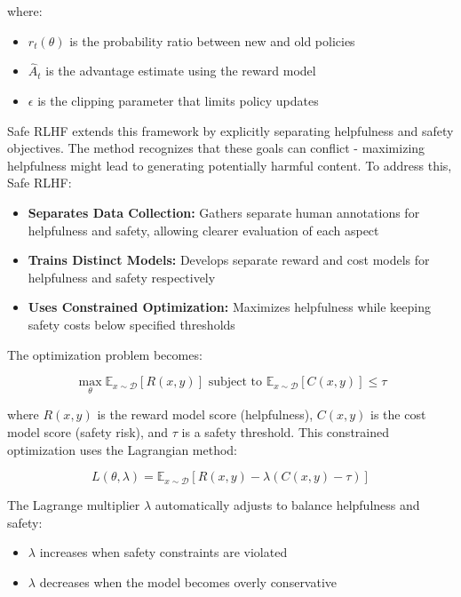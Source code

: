 where:
\begin{itemize}
    \item $r_t(\theta)$ is the probability ratio between new and old policies
    \item $\hat{A}_t$ is the advantage estimate using the reward model
    \item $\epsilon$ is the clipping parameter that limits policy updates
\end{itemize}

Safe RLHF extends this framework by explicitly separating helpfulness and safety objectives. The method recognizes that these goals can conflict - maximizing helpfulness might lead to generating potentially harmful content. To address this, Safe RLHF:

\begin{itemize}
    \item \textbf{Separates Data Collection:} Gathers separate human annotations for helpfulness and safety, allowing clearer evaluation of each aspect
    
    \item \textbf{Trains Distinct Models:} Develops separate reward and cost models for helpfulness and safety respectively
    
    \item \textbf{Uses Constrained Optimization:} Maximizes helpfulness while keeping safety costs below specified thresholds
\end{itemize}

The optimization problem becomes:

\begin{equation}
    \max_\theta \mathbb{E}_{x\sim\mathcal{D}}[R(x,y)] \text{ subject to } \mathbb{E}_{x\sim\mathcal{D}}[C(x,y)] \leq \tau
\end{equation}

where $R(x,y)$ is the reward model score (helpfulness), $C(x,y)$ is the cost model score (safety risk), and $\tau$ is a safety threshold. This constrained optimization uses the Lagrangian method:

\begin{equation}
    L(\theta, \lambda) = \mathbb{E}_{x\sim\mathcal{D}}[R(x,y) - \lambda(C(x,y) - \tau)]
\end{equation}

The Lagrange multiplier $\lambda$ automatically adjusts to balance helpfulness and safety:
\begin{itemize}
    \item $\lambda$ increases when safety constraints are violated
    \item $\lambda$ decreases when the model becomes overly conservative
\end{itemize}

